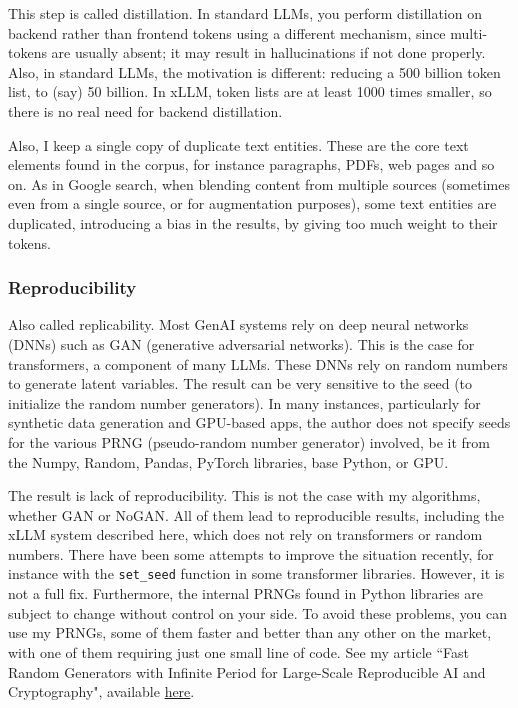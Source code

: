 \documentclass[10pt]{article}
\begin{document}
{This step is called \textcolor{index}{distillation}. In standard LLMs, you perform distillation on backend rather than frontend tokens using a different mechanism, since multi-tokens are usually absent; it may result in hallucinations if not done properly. Also, in standard LLMs, the motivation is different: reducing a 500 billion token list, to (say) 50 billion. In xLLM, token lists are at least 1000 times smaller, so there is no real need for backend distillation.

Also, I keep a single copy of duplicate text entities. These are the core text elements found in the corpus, for instance paragraphs, PDFs, web pages and so on. As in Google search, when blending content from multiple sources (sometimes even from a single source, or for augmentation purposes), some text entities are duplicated, introducing a bias in the results, by giving too much weight to their tokens.


\subsubsection{Reproducibility}

Also called \textcolor{index}{replicability}. 
Most GenAI systems rely on deep neural networks (DNNs) such as GAN (generative adversarial networks). This is the case for transformers, a component of many LLMs. These DNNs rely on random numbers to generate latent variables. The result can be very sensitive to the seed (to initialize the random number generators). In many instances, particularly for synthetic data generation and GPU-based apps, the author does not specify seeds for the various \textcolor{index}{PRNG} (pseudo-random number generator) involved, be it from the Numpy, Random, Pandas, PyTorch libraries, base Python, or \textcolor{index}{GPU}.

The result is lack of \textcolor{index}{reproducibility}. This is not the case with my algorithms, whether GAN or NoGAN. All of them lead to reproducible results, including the xLLM system described here, which does not rely on transformers or random numbers. There have been some attempts to improve the situation recently, for instance with the \texttt{set\_seed} function in some 
\textcolor{index}{transformer} libraries. However, it is not a full fix. Furthermore, the internal PRNGs found in Python libraries are subject to change without control on your side. To avoid these problems, you can use my PRNGs, some of them faster and better than any other on the market, with one of them requiring just one small line of code. See my article ``Fast Random Generators with Infinite Period for Large-Scale Reproducible AI and Cryptography", available \href{https://mltblog.com/4fGDLu0}{here}.

}
\end{document}
